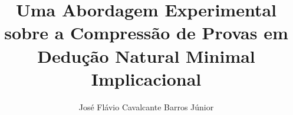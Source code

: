 \documentclass[master, brazilian]{ThesisPUC}
\author{José Flávio Cavalcante Barros Júnior}
\title{Uma Abordagem Experimental sobre a Compressão de Provas em Dedução Natural Minimal Implicacional}
\theoremstyle{definition}
\begin{document}
%   
  
  
  
  
  
  
  
  \arial
  
\end{document}
